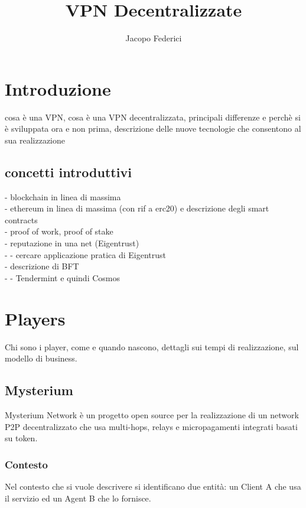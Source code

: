 \documentclass[]{article}
\title{VPN Decentralizzate}
\author{Jacopo Federici}
\begin{document}
	
	\maketitle
	
	\begin{abstract}
		
	\end{abstract}
	
	\section{Introduzione}
	cosa è una VPN, cosa è una VPN decentralizzata, principali differenze e perchè si è sviluppata ora e non prima, descrizione delle nuove tecnologie che consentono al sua realizzazione
	
	\subsection{concetti introduttivi}
	 - blockchain in linea di massima\\
	 - ethereum in linea di massima (con rif a erc20) e descrizione degli smart contracts\\
	 - proof of work, proof of stake\\
	 - reputazione in una net (Eigentrust)\\
	 - - cercare applicazione pratica di Eigentrust\\
	 - descrizione di BFT\\
	 - - Tendermint e quindi Cosmos
	
	
	\section{Players}
	Chi sono i player, come e quando nascono, dettagli sui tempi di realizzazione, sul modello di business.
	
	\subsection{Mysterium}
	Mysterium Network è un progetto open source per la realizzazione di un network P2P decentralizzato che usa multi-hops, relays e micropagamenti integrati basati su token.	
	
	\subsubsection{Contesto}
	Nel contesto che si vuole descrivere si identificano due entità: un Client A che usa il servizio ed un Agent B che lo fornisce.	
\end{document}
